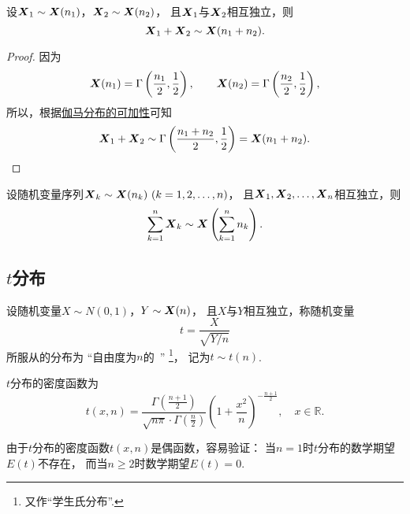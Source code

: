 \begin{theorem}[可加性]\label{theorem:数理统计的基础知识.卡方分布的可加性1}
设\(\boldsymbol{X}_1 \sim \boldsymbol{X}(n_1)\)，\(\boldsymbol{X}_2 \sim \boldsymbol{X}(n_2)\)，
且\(\boldsymbol{X}_1\)与\(\boldsymbol{X}_2\)相互独立，则\begin{equation}
	\boldsymbol{X}_1 + \boldsymbol{X}_2 \sim \boldsymbol{X}(n_1+n_2).
\end{equation}
\begin{proof}
因为\[
	\boldsymbol{X}(n_1) = \Gamma\left(\frac{n_1}{2},\frac12\right), \qquad
	\boldsymbol{X}(n_2) = \Gamma\left(\frac{n_2}{2},\frac12\right),
\]
所以，根据\hyperref[theorem:多维随机变量及其分布.伽马分布的可加性1]{伽马分布的可加性}可知\[
	\boldsymbol{X}_1 + \boldsymbol{X}_2 \sim \Gamma\left(\frac{n_1+n_2}{2},\frac12\right)
	= \boldsymbol{X}(n_1+n_2).
	\qedhere
\]
\end{proof}
\end{theorem}

\begin{corollary}\label{theorem:数理统计的基础知识.卡方分布的可加性2}
设随机变量序列\(\x_k \sim \x(n_k)\ (k=1,2,\dotsc,n)\)，
且\(\boldsymbol{X}_1,\boldsymbol{X}_2,\dotsc,\boldsymbol{X}_n\)相互独立，则\begin{equation}
	\sum_{k=1}^n \boldsymbol{X}_k \sim \boldsymbol{X}\left(\sum_{k=1}^n{n_k}\right).
\end{equation}
\end{corollary}

\subsection{\texorpdfstring{\(t\)}{t}分布}
\begin{definition}
设随机变量\(X \sim N(0,1)\)，\(Y \sim \boldsymbol{X}(n)\)，
且\(X\)与\(Y\)相互独立，称随机变量\begin{equation}
	t = \frac{X}{\sqrt{Y/n}}
\end{equation}
所服从的分布为
“自由度为\(n\)的~”
\footnote{又作“学生氏分布”.}，
记为\(t \sim t(n)\).
\end{definition}

\begin{theorem}\label{theorem:数理统计的基础知识.学生氏分布的密度函数}
\(t\)分布的密度函数为\begin{equation}
	t(x,n) = \frac{
		\Gamma\left(\frac{n+1}{2}\right)
	}{
		\sqrt{n\pi} \cdot \Gamma\left(\frac{n}{2}\right)
	}
	\left(1+\frac{x^2}{n}\right)^{-\frac{n+1}{2}},
	\quad x \in \mathbb{R}.
\end{equation}
\end{theorem}

由于\(t\)分布的密度函数\(t(x,n)\)是偶函数，容易验证：
当\(n=1\)时\(t\)分布的数学期望\(E(t)\)不存在，
而当\(n \geq 2\)时数学期望\(E(t)=0\).

